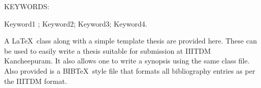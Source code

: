 
\abstract

\noindent KEYWORDS: \hspace*{0.5em} \parbox[t]{4.4in}{Keyword1 ; Keyword2;
  Keyword3; Keyword4.}

\vspace*{24pt}

\noindent A \LaTeX\ class along with a simple template thesis are
provided here.  These can be used to easily write a thesis suitable
for submission at IIITDM Kancheepuram. It also allows one to write a
synopsis using the same class file.  Also provided is a BIB\TeX\ style
file that formats all bibliography entries as per the IIITDM format.

\pagebreak